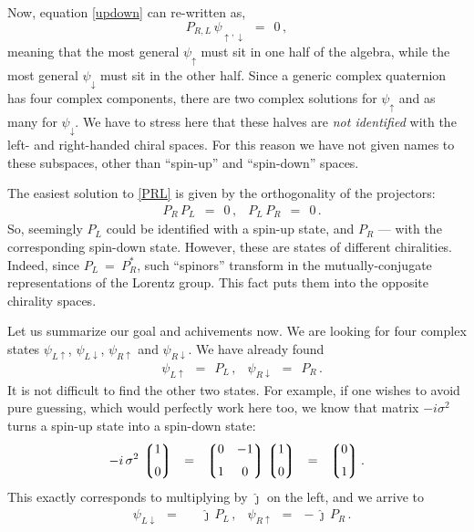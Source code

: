 \documentclass[epsfig,12pt]{article}
\newcommand{\lgr}{\left\lgroup}
\newcommand{\rgr}{\right\rgroup}
\newcommand{\jj}{\hat\jmath}
\begin{document}
	Now, equation \eqref{updown} can re-written as,
\begin{equation}
\label{PRL}
	P_{R,L}\, \psi_{\uparrow,\downarrow}		~~=~~		0\,,
\end{equation}
	meaning that the most general $ \psi_\uparrow $ must sit in one half of the algebra,
	while the most general $ \psi_\downarrow $ must sit in the other half.
	Since a generic complex quaternion has four complex components,
	there are two complex solutions for $ \psi_\uparrow $ and as many for $ \psi_\downarrow $.
	We have to stress here that these halves are \emph{not identified} with the left-
	and right-handed chiral spaces.
	For this reason we have not given names to these subspaces, other than ``spin-up'' and
	``spin-down'' spaces.

	The easiest solution to \eqref{PRL} is given by the orthogonality of the projectors:
\begin{align}
	&
	P_R\, P_L	~~=~~	0\,,
	&
	P_L\, P_R	~~=~~	0\,.
\end{align}
	So, seemingly $ P_L $ could be identified with a spin-up state, and $ P_R $ --- with the corresponding
	spin-down state.
	However, these are states of different chiralities.
	Indeed, since $ P_L ~=~ P_R^* $, such ``spinors'' transform in the mutually-conjugate
	representations of the Lorentz group.
	This fact puts them into the opposite chirality spaces.

	Let us summarize our goal and achivements now.
	We are looking for four complex states $ \psi_{L\uparrow} $, $ \psi_{L\downarrow} $, $ \psi_{R\uparrow} $
	and $ \psi_{R\downarrow} $.
	We have already found
\begin{align}
	&
	\psi_{L\uparrow}		~~=~~	P_L\,,
	&
	\psi_{R\downarrow}	~~=~~	P_R\,.
\end{align}
	It is not difficult to find the other two states.
	For example, if one wishes to avoid pure guessing, which would perfectly work here too,
	we know that matrix $ -i \sigma^2 $ turns a spin-up state into a spin-down state:
\[
	-i\,\sigma^2\,
		\lgr
		\begin{matrix}
			1 \\[2mm]
			0
		\end{matrix}
		\rgr
	~~=~~
		\lgr
		\begin{matrix}
			0	&	-1 \\[2mm]
			1	&	0
		\end{matrix}
		\rgr
		\lgr
		\begin{matrix}
			1 \\[2mm]
			0
		\end{matrix}
		\rgr
	~~=~~
		\lgr
		\begin{matrix}
			0 \\[2mm]
			1
		\end{matrix}
		\rgr.	
\]
	This exactly corresponds to multiplying by $ \jj $ on the left, and we arrive to
\begin{align}
	&
	\psi_{L\downarrow}	~~=~~	\phantom{-}\jj\,P_L\,,
	&
	\psi_{R\uparrow}		~~=~~	-\jj\,P_R\,.
\end{align}
\end{document}
